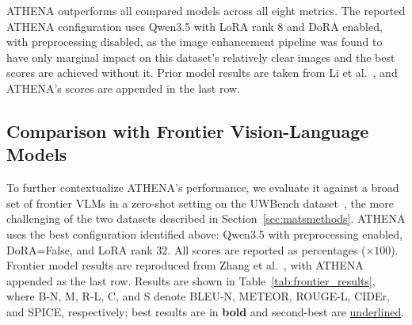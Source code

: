 \begin{table}[h!]
\centering
\caption[Benchmark comparison on the Li et al.\ dataset]{Benchmark comparison on the Li et al.\ dataset~\cite{mainref}}
\label{tab:results}
\end{table}

ATHENA outperforms all compared models across all eight metrics. The reported ATHENA configuration uses Qwen3.5 with LoRA rank 8 and DoRA enabled, with preprocessing disabled, as the image enhancement pipeline was found to have only marginal impact on this dataset's relatively clear images and the best scores are achieved without it. Prior model results are taken from Li et al.~\cite{mainref}, and ATHENA's scores are appended in the last row.

\subsection*{Comparison with Frontier Vision-Language Models}

To further contextualize ATHENA's performance, we evaluate it against a broad set of frontier VLMs in a zero-shot setting on the UWBench dataset~\cite{uwbench}, the more challenging of the two datasets described in Section~\ref{sec:matsmethods}. ATHENA uses the best configuration identified above: Qwen3.5 with preprocessing enabled, DoRA=False, and LoRA rank 32. All scores are reported as percentages ($\times 100$). Frontier model results are reproduced from Zhang et al.~\cite{uwbench}, with ATHENA appended as the last row. Results are shown in Table~\ref{tab:frontier_results}, where B-N, M, R-L, C, and S denote BLEU-N, METEOR, ROUGE-L, CIDEr, and SPICE, respectively; best results are in \textbf{bold} and second-best are \underline{underlined}.

